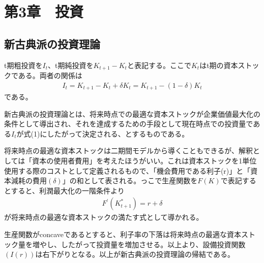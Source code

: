 \documentclass{jsarticle}
\begin{document}
\section{第3章　投資}
\subsection{新古典派の投資理論}
t期粗投資を$I_t$、t期純投資を$K_{t+1} - K_t$と表記する。ここで$K_t$はt期の資本ストックである。両者の関係は
\begin{align}
	I_t = K_{t+1} - K_t + \delta K_t = K_{t+1} -(1 - \delta)K_t
\end{align}
である。

新古典派の投資理論とは、将来時点での最適な資本ストックが企業価値最大化の条件として導出され、それを達成するための手段として現在時点での投資量である$I_t$が式(1)にしたがって決定される、とするものである。

将来時点の最適な資本ストックは二期間モデルから導くこともできるが、解釈としては「資本の使用者費用」を考えたほうがいい。これは資本ストックを1単位使用する際のコストとして定義されるもので、「機会費用である利子(r)」と「資本減耗の費用$(\delta)$」の和として表される。っこで生産関数を$F(K)$で表記するとすると、利潤最大化の一階条件より
\begin{align}
	F^{'}(K_{t+1}^*) = r + \delta
\end{align}
が将来時点の最適な資本ストックの満たす式として導かれる。

生産関数がconcaveであるとすると、利子率の下落は将来時点の最適な資本ストック量を増やし、したがって投資量を増加させる。以上より、設備投資関数$(I(r))$は右下がりとなる。以上が新古典派の投資理論の帰結である。
\end{document}
